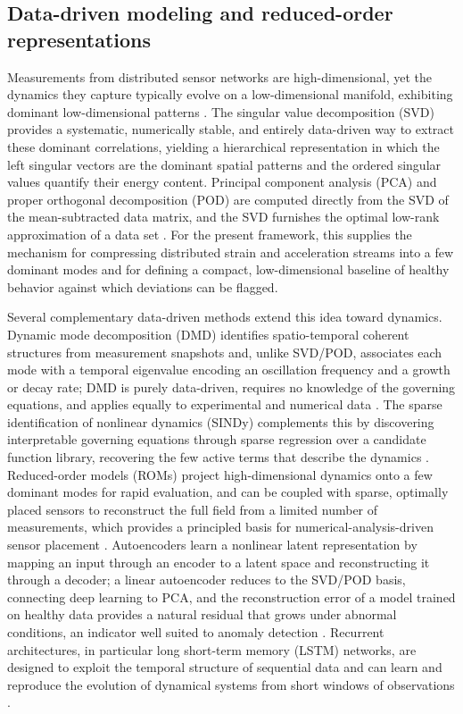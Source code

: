 \subsection{Data-driven modeling and reduced-order representations}\label{subsec:datadriven}

Measurements from distributed sensor networks are high-dimensional, yet the dynamics they capture typically evolve on a low-dimensional manifold, exhibiting dominant low-dimensional patterns \citep{brunton2019data}. The singular value decomposition (SVD) provides a systematic, numerically stable, and entirely data-driven way to extract these dominant correlations, yielding a hierarchical representation in which the left singular vectors are the dominant spatial patterns and the ordered singular values quantify their energy content. Principal component analysis (PCA) and proper orthogonal decomposition (POD) are computed directly from the SVD of the mean-subtracted data matrix, and the SVD furnishes the optimal low-rank approximation of a data set \citep{brunton2019data}. For the present framework, this supplies the mechanism for compressing distributed strain and acceleration streams into a few dominant modes and for defining a compact, low-dimensional baseline of healthy behavior against which deviations can be flagged.

Several complementary data-driven methods extend this idea toward dynamics. Dynamic mode decomposition (DMD) identifies spatio-temporal coherent structures from measurement snapshots and, unlike SVD/POD, associates each mode with a temporal eigenvalue encoding an oscillation frequency and a growth or decay rate; DMD is purely data-driven, requires no knowledge of the governing equations, and applies equally to experimental and numerical data \citep{brunton2019data}. The sparse identification of nonlinear dynamics (SINDy) complements this by discovering interpretable governing equations through sparse regression over a candidate function library, recovering the few active terms that describe the dynamics \citep{brunton2019data}. Reduced-order models (ROMs) project high-dimensional dynamics onto a few dominant modes for rapid evaluation, and can be coupled with sparse, optimally placed sensors to reconstruct the full field from a limited number of measurements, which provides a principled basis for numerical-analysis-driven sensor placement \citep{brunton2019data,tan2020sensorplacement,hassani2023sensorplacement}. Autoencoders learn a nonlinear latent representation by mapping an input through an encoder to a latent space and reconstructing it through a decoder; a linear autoencoder reduces to the SVD/POD basis, connecting deep learning to PCA, and the reconstruction error of a model trained on healthy data provides a natural residual that grows under abnormal conditions, an indicator well suited to anomaly detection \citep{brunton2019data}. Recurrent architectures, in particular long short-term memory (LSTM) networks, are designed to exploit the temporal structure of sequential data and can learn and reproduce the evolution of dynamical systems from short windows of observations \citep{brunton2019data}.


